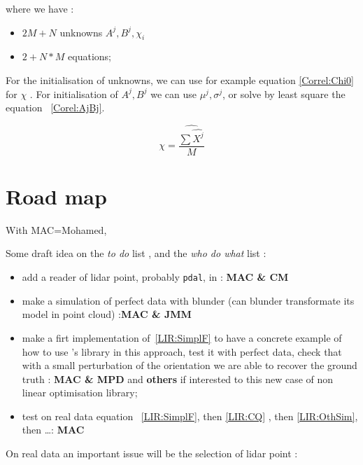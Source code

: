 where we have :

\begin{itemize}
	\item $2 M + N$ unknowns  $A^j,B^j,\chi _i$
   \item $2 + N*M$ equations;		 
\end{itemize}


For the initialisation of unknowns, we can use for example equation  \ref{Correl:Chi0} for  $\chi$ .
For initialisation of $A^j, B^j$ we can use $\mu^j,\sigma^j$, or solve by least square the
equation ~\ref{Corel:AjBj}.

\begin{equation}
	\chi = \widehat {\frac{\sum \widehat {X^j} }{M}} \label{Correl:Chi0}
\end{equation}



\section{Road map}

With MAC=Mohamed,

Some draft idea on the \emph{to do} list , and the  \emph{who do what} list :

\begin{itemize}
    \item  add a reader of lidar point, probably {\tt pdal}, in \PPP  :  {\bf MAC \& CM}

    \item  make a simulation of perfect data with blunder  (can blunder transformate its model in point cloud) :{\bf MAC \& JMM}

    \item make a firt implementation of~\ref{LIR:SimplF} to have a concrete example of 
         how to use  \PPP's library in this approach, test it with perfect data, check that  with
         a small perturbation of the orientation we are able to recover the ground truth :
         {\bf  MAC \& MPD} and {\bf  others} if interested to this new case of non linear optimisation library;

    \item test on real data equation ~\ref{LIR:SimplF}, then \ref{LIR:CQ} , then \ref{LIR:OthSim}, then \dots  : {\bf MAC} 
\end{itemize}

On real data an important issue will be  the selection of lidar point  : 

